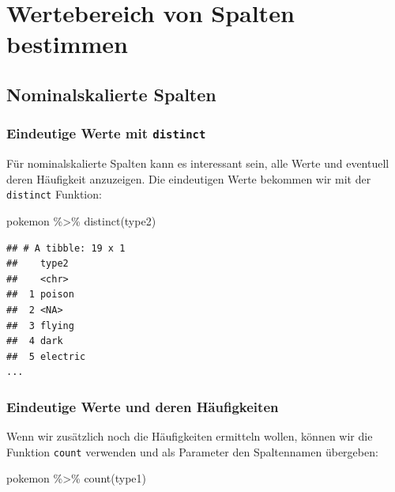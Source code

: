 \documentclass[
]{book}
\newenvironment{Shaded}{\begin{snugshade}}{\end{snugshade}}
\newcommand{\FunctionTok}[1]{\textcolor[rgb]{0.00,0.00,0.00}{#1}}
\newcommand{\NormalTok}[1]{#1}
\newcommand{\SpecialCharTok}[1]{\textcolor[rgb]{0.00,0.00,0.00}{#1}}
\begin{document}
\hypertarget{wertebereich-von-spalten-bestimmen}{%
\section{Wertebereich von Spalten bestimmen}\label{wertebereich-von-spalten-bestimmen}}

\hypertarget{wertebereich-nominalskaliert}{%
\subsection{Nominalskalierte Spalten}\label{wertebereich-nominalskaliert}}

\hypertarget{eindeutige-werte-mit-distinct}{%
\subsubsection{\texorpdfstring{Eindeutige Werte mit \texttt{distinct}}{Eindeutige Werte mit distinct}}\label{eindeutige-werte-mit-distinct}}

Für nominalskalierte Spalten kann es interessant sein, alle Werte und eventuell deren Häufigkeit anzuzeigen. Die eindeutigen Werte bekommen wir mit der \texttt{distinct} Funktion:

\begin{Shaded}
\begin{Highlighting}[]
\NormalTok{pokemon }\SpecialCharTok{\%\textgreater{}\%}
  \FunctionTok{distinct}\NormalTok{(type2)}
\end{Highlighting}
\end{Shaded}

\begin{verbatim}
## # A tibble: 19 x 1
##    type2   
##    <chr>   
##  1 poison  
##  2 <NA>    
##  3 flying  
##  4 dark    
##  5 electric
...
\end{verbatim}

\hypertarget{eindeutige-werte-und-deren-huxe4ufigkeiten}{%
\subsubsection{Eindeutige Werte und deren Häufigkeiten}\label{eindeutige-werte-und-deren-huxe4ufigkeiten}}

Wenn wir zusätzlich noch die Häufigkeiten ermitteln wollen, können wir die Funktion \texttt{count} verwenden und als Parameter den Spaltennamen übergeben:

\begin{Shaded}
\begin{Highlighting}[]
\NormalTok{pokemon }\SpecialCharTok{\%\textgreater{}\%} 
  \FunctionTok{count}\NormalTok{(type1)}
\end{Highlighting}
\end{Shaded}
\end{document}
